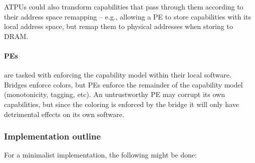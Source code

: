 ATPUs could also transform capabilities that pass through them according to their address space remapping -- e.g., allowing a PE to store capabilities with its local address space, but remap them to physical addresses when storing to DRAM.

\paragraph{PEs} are tasked with enforcing the capability model within their local software.  Bridges enforce colors, but PEs enforce the remainder of the capability model (monotonicity, tagging, etc).  An untrustworthy PE may corrupt its own capabilities, but since the coloring is enforced by the bridge it will only have detrimental effects on its own software.

\subsubsection{Implementation outline}
For a minimalist implementation, the following might be done:

